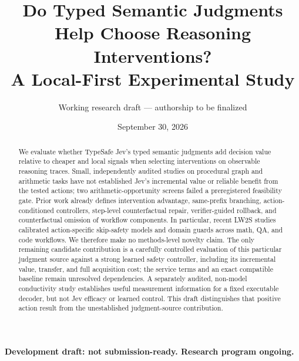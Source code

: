 \documentclass[11pt]{article}
\title{Do Typed Semantic Judgments Help Choose Reasoning Interventions?\\A Local-First Experimental Study}
\author{Working research draft --- authorship to be finalized}
\date{September 30, 2026}
\begin{document}
\maketitle
\begin{center}\textbf{Development draft: not submission-ready. Research program ongoing.}\end{center}
\begin{abstract}
We evaluate whether TypeSafe Jev's typed semantic judgments add decision value relative to cheaper and local signals when selecting interventions on observable reasoning traces. Small, independently audited studies on procedural graph and arithmetic tasks have not established Jev's incremental value or reliable benefit from the tested actions; two arithmetic-opportunity screens failed a preregistered feasibility gate. Prior work already defines intervention advantage, same-prefix branching, action-conditioned controllers, step-level counterfactual repair, verifier-guided rollback, and counterfactual omission of workflow components. In particular, recent LW2S studies calibrated action-specific skip-safety models and domain guards across math, QA, and code workflows. We therefore make no methods-level novelty claim. The only remaining candidate contribution is a carefully controlled evaluation of this particular judgment source against a strong learned safety controller, including its incremental value, transfer, and full acquisition cost; the service terms and an exact compatible baseline remain unresolved dependencies. A separately audited, non-model conductivity study establishes useful measurement information for a fixed executable decoder, but not Jev efficacy or learned control. This draft distinguishes that positive action result from the unestablished judgment-source contribution.
\end{abstract}
\end{document}
